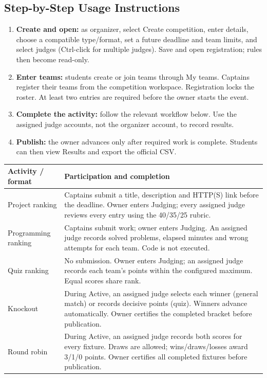\documentclass[12pt]{article}
\begin{document}
\subsection{Step-by-Step Usage Instructions}
\begin{enumerate}
\item \textbf{Create and open:} as organizer, select Create competition, enter details, choose a compatible type/format, set a future deadline and team limits, and select judges (Ctrl-click for multiple judges). Save and open registration; rules then become read-only.
\item \textbf{Enter teams:} students create or join teams through My teams. Captains register their teams from the competition workspace. Registration locks the roster. At least two entries are required before the owner starts the event.
\item \textbf{Complete the activity:} follow the relevant workflow below. Use the assigned judge accounts, not the organizer account, to record results.
\item \textbf{Publish:} the owner advances only after required work is complete. Students can then view Results and export the official CSV.
\end{enumerate}
\begin{tabularx}{\linewidth}{lY}\toprule Activity / format & Participation and completion\\\midrule
Project ranking & Captains submit a title, description and HTTP(S) link before the deadline. Owner enters Judging; every assigned judge reviews every entry using the 40/35/25 rubric.\\
Programming ranking & Captains submit work; owner enters Judging. An assigned judge records solved problems, elapsed minutes and wrong attempts for each team. Code is not executed.\\
Quiz ranking & No submission. Owner enters Judging; an assigned judge records each team's points within the configured maximum. Equal scores share rank.\\
Knockout & During Active, an assigned judge selects each winner (general match) or records decisive points (quiz). Winners advance automatically. Owner certifies the completed bracket before publication.\\
Round robin & During Active, an assigned judge records both scores for every fixture. Draws are allowed; wins/draws/losses award 3/1/0 points. Owner certifies all completed fixtures before publication.\\\bottomrule\end{tabularx}
\end{document}
